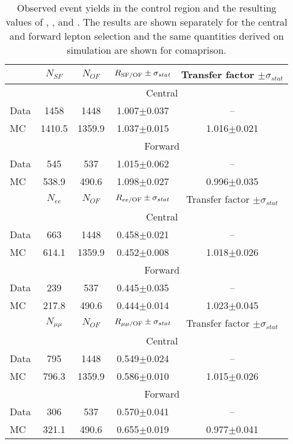 
\begin{table}[hbtp]
 \renewcommand{\arraystretch}{1.3}
 \setlength{\belowcaptionskip}{6pt}
 \centering
 \caption{Observed event yields in the control region and the resulting values of \Rsfof, \Reeof, and \Rmmof. The results are shown separately for the central and forward lepton selection and the same quantities derived on simulation are shown for comaprison.}
  \label{tab:rSFOF}
\begin{tabular}{l|c|c|c|c}     
 & $N_{SF}$ & $N_{OF}$ & $ R_{\text{SF/OF}} \pm \sigma_{stat}$ & Transfer factor $\pm \sigma_{stat}$  \\    
\hline
&  \multicolumn{4}{c}{Central} \\
\hline
 Data & 1458 & 1448 & 1.007$\pm$0.037 & -- \\
 MC & 1410.5 & 1359.9 & 1.037$\pm$0.015 & 1.016$\pm$0.021\\
 
 
    \hline 
& \multicolumn{4}{c}{Forward} \\
\hline
 Data & 545 & 537 & 1.015$\pm$0.062 & -- \\
 MC & 538.9 & 490.6 & 1.098$\pm$0.027 & 0.996$\pm$0.035\\

\hline\hline
 & $N_{ee}$ & $N_{OF}$ & $ R_\text{$ee$/OF} \pm \sigma_{stat}$ & Transfer factor $\pm \sigma_{stat}$  \\    
\hline
&  \multicolumn{4}{c}{Central} \\
\hline
 Data & 663 & 1448 & 0.458$\pm$0.021 & -- \\
 MC & 614.1 & 1359.9 & 0.452$\pm$0.008 & 1.018$\pm$0.026\\
 
 
    \hline 
& \multicolumn{4}{c}{Forward} \\
\hline
 Data & 239 & 537 & 0.445$\pm$0.035 & -- \\
 MC & 217.8 & 490.6 & 0.444$\pm$0.014 & 1.023$\pm$0.045\\

\hline\hline
 & $N_{\mu\mu}$ & $N_{OF}$ & $ R_\text{$\mu\mu$/OF} \pm \sigma_{stat}$ & Transfer factor $\pm \sigma_{stat}$  \\    
\hline
& \multicolumn{4}{c}{Central} \\
\hline
 Data & 795 & 1448 & 0.549$\pm$0.024 & -- \\
 MC & 796.3 & 1359.9 & 0.586$\pm$0.010 & 1.015$\pm$0.026\\
 
 
    \hline 
 & \multicolumn{4}{c}{Forward} \\
\hline
 Data & 306 & 537 & 0.570$\pm$0.041 & -- \\
 MC & 321.1 & 490.6 & 0.655$\pm$0.019 & 0.977$\pm$0.041\\

  
\end{tabular}  
\end{table}
